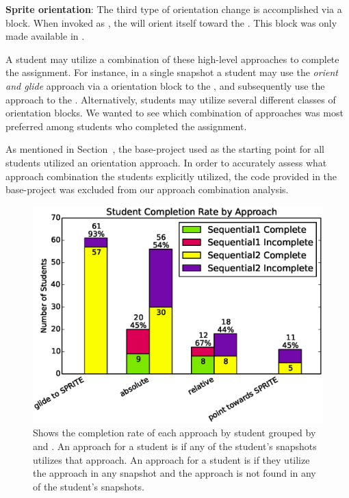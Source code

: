 \textbf{Sprite orientation}: The third type of orientation change is
accomplished via a \pointtoward{} block. When invoked as
\pointtoward[\zebra{}]{}, the \net{} will orient itself toward the
\zebra{}. This block was only made available in \stwo{}.

A student may utilize a combination of these high-level approaches to complete
the assignment. For instance, in a single snapshot a student may use the
\emph{orient and glide} approach via a \rel{} orientation block to \catch{} the
\bear{}, and subsequently use the \glideto{} approach to \catch{} the
\horse{}. Alternatively, students may utilize several different classes of
orientation blocks. We wanted to see which combination of approaches was most
preferred among students who completed the assignment.

As mentioned in Section~, the base-project used as the
starting point for all students utilized an \abs{} orientation approach. In
order to accurately assess what approach combination the students explicitly
utilized, the code provided in the base-project was excluded from our approach
combination analysis.

\begin{figure}[!t]
\centering
\includegraphics[width=5.25in]{graphs/approach_student_success.eps}
\caption{Shows the completion rate of each approach by student grouped by
  \sone{} and \stwo{}. An approach for a student is \com{} if any of the
  student's \com{} snapshots utilizes that approach. An approach for a student
  is \incom{} if they utilize the approach in any \incom{} snapshot and the
  approach is not found in any of the student's \com{} snapshots.}
\end{figure}


